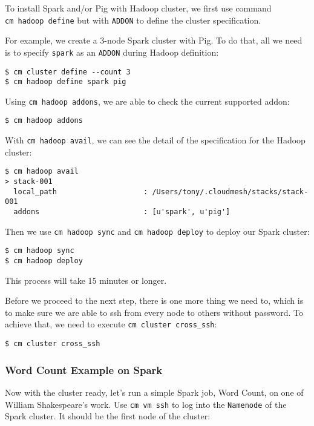 To install Spark and/or Pig with Hadoop cluster, we first use command
\texttt{cm\ hadoop\ define} but with \texttt{ADDON} to define the
cluster specification.

For example, we create a 3-node Spark cluster with Pig. To do that, all
we need is to specify \texttt{spark} as an \texttt{ADDON} during Hadoop
definition:

\begin{verbatim}
$ cm cluster define --count 3
$ cm hadoop define spark pig
\end{verbatim}

Using \texttt{cm\ hadoop\ addons}, we are able to check the current
supported addon:

\begin{verbatim}
$ cm hadoop addons
\end{verbatim}

With \texttt{cm\ hadoop\ avail}, we can see the detail of the
specification for the Hadoop cluster:

\begin{verbatim}
$ cm hadoop avail
> stack-001
  local_path                    : /Users/tony/.cloudmesh/stacks/stack-001
  addons                        : [u'spark', u'pig']
\end{verbatim}

Then we use \texttt{cm\ hadoop\ sync} and \texttt{cm\ hadoop\ deploy} to
deploy our Spark cluster:

\begin{verbatim}
$ cm hadoop sync
$ cm hadoop deploy
\end{verbatim}

This process will take 15 minutes or longer.

Before we proceed to the next step, there is one more thing we need to,
which is to make sure we are able to ssh from every node to others
without password. To achieve that, we need to execute
\texttt{cm\ cluster\ cross\_ssh}:

\begin{verbatim}
$ cm cluster cross_ssh
\end{verbatim}

\subsubsection{Word Count Example on
Spark}\label{word-count-example-on-spark}

Now with the cluster ready, let's run a simple Spark job, Word Count, on
one of William Shakespeare's work. Use \texttt{cm\ vm\ ssh} to log into
the \texttt{Namenode} of the Spark cluster. It should be the first node
of the cluster:

